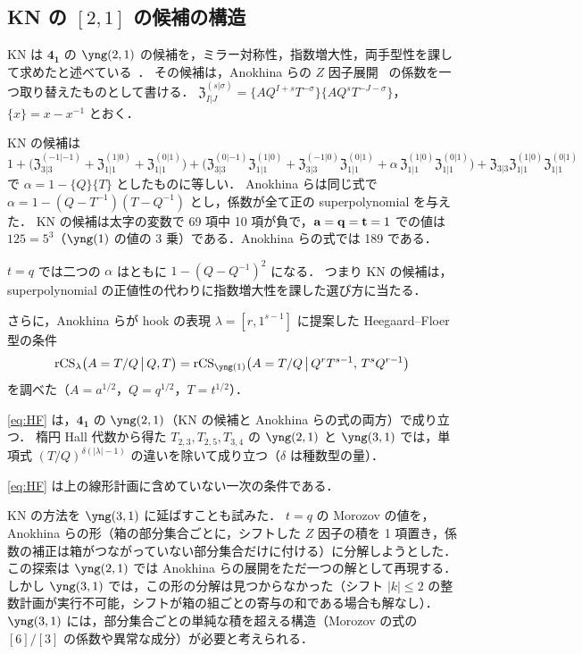 \subsection{\texorpdfstring{KN の $[2,1]$ の候補の構造}{KN の [2,1] の候補の構造}}\label{sec:fig8-21}
KN は $\mathbf{4_1}$ の $\yng(2,1)$ の候補を，ミラー対称性，指数増大性，両手型性を課して求めたと述べている~\cite{Kameyama17}．
その候補は，Anokhina らの $Z$ 因子展開~\cite{Anokhina12} の係数を一つ取り替えたものとして書ける．
$\mathfrak{Z}_{I|J}^{(s|\sigma)}=\{AQ^{I+s}T^{-\sigma}\}\{AQ^sT^{-J-\sigma}\}$，$\{x\}=x-x^{-1}$ とおく．
\begin{compresult}\label{cr:fig8-21}
KN の候補は
\[
1+\bigl(\mathfrak Z^{(-1|-1)}_{3|3}+\mathfrak Z^{(1|0)}_{1|1}+\mathfrak Z^{(0|1)}_{1|1}\bigr)
+\bigl(\mathfrak Z^{(0|-1)}_{3|3}\mathfrak Z^{(1|0)}_{1|1}+\mathfrak Z^{(-1|0)}_{3|3}\mathfrak Z^{(0|1)}_{1|1}+\alpha\,\mathfrak Z^{(1|0)}_{1|1}\mathfrak Z^{(0|1)}_{1|1}\bigr)
+\mathfrak Z_{3|3}\mathfrak Z^{(1|0)}_{1|1}\mathfrak Z^{(0|1)}_{1|1}
\]
で $\alpha=1-\{Q\}\{T\}$ としたものに等しい．
Anokhina らは同じ式で $\alpha=1-(Q-T^{-1})(T-Q^{-1})$ とし，係数が全て正の superpolynomial を与えた．
KN の候補は太字の変数で 69 項中 10 項が負で，$\mathbf{a}=\mathbf{q}=\mathbf{t}=1$ での値は $125=5^3$（$\yng(1)$ の値の 3 乗）である．Anokhina らの式では 189 である．
\end{compresult}
$t=q$ では二つの $\alpha$ はともに $1-(Q-Q^{-1})^2$ になる．
つまり KN の候補は，superpolynomial の正値性の代わりに指数増大性を課した選び方に当たる．

さらに，Anokhina らが hook の表現 $\lambda=[r,1^{s-1}]$ に提案した Heegaard--Floer 型の条件
\begin{equation}\label{eq:HF}
\rCS_\lambda\bigl(A=T/Q\,\big|\,Q,T\bigr)=\rCS_{\yng(1)}\bigl(A=T/Q\,\big|\,Q^rT^{s-1},\,T^sQ^{r-1}\bigr)
\end{equation}
を調べた（$A=a^{1/2}$，$Q=q^{1/2}$，$T=t^{1/2}$）．
\begin{compresult}\label{cr:HF}
\eqref{eq:HF} は，$\mathbf{4_1}$ の $\yng(2,1)$（KN の候補と Anokhina らの式の両方）で成り立つ．
楕円 Hall 代数から得た $T_{2,3},T_{2,5},T_{3,4}$ の $\yng(2,1)$ と $\yng(3,1)$ では，単項式 $(T/Q)^{\delta(|\lambda|-1)}$ の違いを除いて成り立つ（$\delta$ は種数型の量）．
\end{compresult}
\eqref{eq:HF} は上の線形計画に含めていない一次の条件である．

KN の方法を $\yng(3,1)$ に延ばすことも試みた．
$t=q$ の Morozov の値を，Anokhina らの形（箱の部分集合ごとに，シフトした $Z$ 因子の積を 1 項置き，係数の補正は箱がつながっていない部分集合だけに付ける）に分解しようとした．
この探索は $\yng(2,1)$ では Anokhina らの展開をただ一つの解として再現する．
しかし $\yng(3,1)$ では，この形の分解は見つからなかった（シフト $|k|\le2$ の整数計画が実行不可能，シフトが箱の組ごとの寄与の和である場合も解なし）．
$\yng(3,1)$ には，部分集合ごとの単純な積を超える構造（Morozov の式の $[6]/[3]$ の係数や異常な成分）が必要と考えられる．
